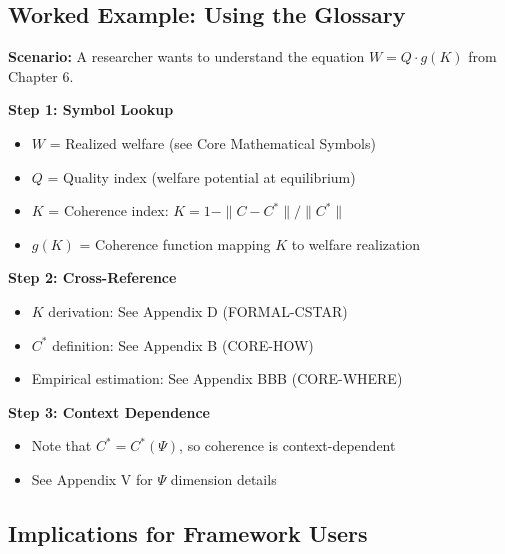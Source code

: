 
\subsection{Worked Example: Using the Glossary}
\label{sec:glossary-example}

\textbf{Scenario:} A researcher wants to understand the equation $W = Q \cdot g(K)$ from Chapter 6.

\textbf{Step 1: Symbol Lookup}
\begin{itemize}[nosep]
    \item $W$ = Realized welfare (see Core Mathematical Symbols)
    \item $Q$ = Quality index (welfare potential at equilibrium)
    \item $K$ = Coherence index: $K = 1 - \|C - C^*\|/\|C^*\|$
    \item $g(K)$ = Coherence function mapping $K$ to welfare realization
\end{itemize}

\textbf{Step 2: Cross-Reference}
\begin{itemize}[nosep]
    \item $K$ derivation: See Appendix D (FORMAL-CSTAR)
    \item $C^*$ definition: See Appendix B (CORE-HOW)
    \item Empirical estimation: See Appendix BBB (CORE-WHERE)
\end{itemize}

\textbf{Step 3: Context Dependence}
\begin{itemize}[nosep]
    \item Note that $C^* = C^*(\Psi)$, so coherence is context-dependent
    \item See Appendix V for $\Psi$ dimension details
\end{itemize}

\subsection{Implications for Framework Users}
\label{sec:glossary-implications}

